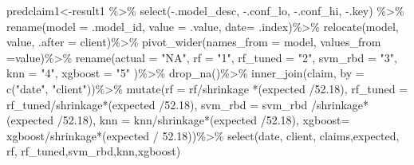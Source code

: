 \documentclass[
]{article}
\newenvironment{Shaded}{\begin{snugshade}}{\end{snugshade}}
\newcommand{\AttributeTok}[1]{\textcolor[rgb]{0.77,0.63,0.00}{#1}}
\newcommand{\FloatTok}[1]{\textcolor[rgb]{0.00,0.00,0.81}{#1}}
\newcommand{\FunctionTok}[1]{\textcolor[rgb]{0.00,0.00,0.00}{#1}}
\newcommand{\NormalTok}[1]{#1}
\newcommand{\OtherTok}[1]{\textcolor[rgb]{0.56,0.35,0.01}{#1}}
\newcommand{\SpecialCharTok}[1]{\textcolor[rgb]{0.00,0.00,0.00}{#1}}
\newcommand{\StringTok}[1]{\textcolor[rgb]{0.31,0.60,0.02}{#1}}
\begin{document}
\begin{Shaded}
\begin{Highlighting}[]
\NormalTok{predclaim1}\OtherTok{\textless{}{-}}\NormalTok{result1 }\SpecialCharTok{\%\textgreater{}\%}
  \FunctionTok{select}\NormalTok{(}\SpecialCharTok{{-}}\NormalTok{.model\_desc, }\SpecialCharTok{{-}}\NormalTok{.conf\_lo, }\SpecialCharTok{{-}}\NormalTok{.conf\_hi, }\SpecialCharTok{{-}}\NormalTok{.key) }\SpecialCharTok{\%\textgreater{}\%}
  \FunctionTok{rename}\NormalTok{(}\AttributeTok{model =}\NormalTok{ .model\_id, }\AttributeTok{value =}\NormalTok{ .value, }\AttributeTok{date=}\NormalTok{ .index)}\SpecialCharTok{\%\textgreater{}\%}
  \FunctionTok{relocate}\NormalTok{(model, value, }\AttributeTok{.after =}\NormalTok{ client)}\SpecialCharTok{\%\textgreater{}\%}
  \FunctionTok{pivot\_wider}\NormalTok{(}\AttributeTok{names\_from =}\NormalTok{ model, }\AttributeTok{values\_from =}\NormalTok{value)}\SpecialCharTok{\%\textgreater{}\%}
  \FunctionTok{rename}\NormalTok{(}\AttributeTok{actual =} \StringTok{"NA"}\NormalTok{, }\AttributeTok{rf =} \StringTok{"1"}\NormalTok{, }\AttributeTok{rf\_tuned =} \StringTok{"2"}\NormalTok{, }\AttributeTok{svm\_rbd =} \StringTok{"3"}\NormalTok{, }\AttributeTok{knn =} \StringTok{"4"}\NormalTok{, }\AttributeTok{xgboost =} \StringTok{"5"}\NormalTok{ )}\SpecialCharTok{\%\textgreater{}\%}
  \FunctionTok{drop\_na}\NormalTok{()}\SpecialCharTok{\%\textgreater{}\%}
 \FunctionTok{inner\_join}\NormalTok{(claim, }\AttributeTok{by =} \FunctionTok{c}\NormalTok{(}\StringTok{"date"}\NormalTok{, }\StringTok{"client"}\NormalTok{))}\SpecialCharTok{\%\textgreater{}\%}
  \FunctionTok{mutate}\NormalTok{(}\AttributeTok{rf =}\NormalTok{ rf}\SpecialCharTok{/}\NormalTok{shrinkage }\SpecialCharTok{*}\NormalTok{(expected }\SpecialCharTok{/}\FloatTok{52.18}\NormalTok{),}
         \AttributeTok{rf\_tuned =}\NormalTok{ rf\_tuned}\SpecialCharTok{/}\NormalTok{shrinkage}\SpecialCharTok{*}\NormalTok{(expected }\SpecialCharTok{/}\FloatTok{52.18}\NormalTok{),}
         \AttributeTok{svm\_rbd =}\NormalTok{ svm\_rbd }\SpecialCharTok{/}\NormalTok{shrinkage}\SpecialCharTok{*}\NormalTok{(expected }\SpecialCharTok{/}\FloatTok{52.18}\NormalTok{),}
         \AttributeTok{knn =}\NormalTok{ knn}\SpecialCharTok{/}\NormalTok{shrinkage}\SpecialCharTok{*}\NormalTok{(expected }\SpecialCharTok{/}\FloatTok{52.18}\NormalTok{),}
         \AttributeTok{xgboost=}\NormalTok{ xgboost}\SpecialCharTok{/}\NormalTok{shrinkage}\SpecialCharTok{*}\NormalTok{(expected }\SpecialCharTok{/} \FloatTok{52.18}\NormalTok{))}\SpecialCharTok{\%\textgreater{}\%}
  \FunctionTok{select}\NormalTok{(date, client, claims,expected, rf, rf\_tuned,svm\_rbd,knn,xgboost)}


\end{Highlighting}
\end{Shaded}
\end{document}
